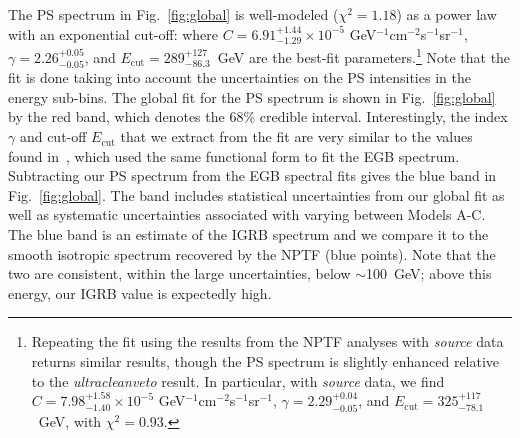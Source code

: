 The PS spectrum in Fig.~\ref{fig:global} is well-modeled (\mbox{$\chi^2 = 1.18$}) as a power law with an exponential cut-off:
where $C=6.91_{-1.29}^{+1.44} \times 10^{-5}$ GeV$^{-1}$cm$^{-2}$s$^{-1}$sr$^{-1}$,  $\gamma= 2.26_{-0.05}^{+0.05}$, and $E_\text{cut} = 289_{-86.3}^{+127}$~GeV are the best-fit parameters.\footnote{Repeating the fit using the results from the NPTF analyses with {\it source} data returns similar results, though the PS spectrum is slightly enhanced relative to the {\it ultracleanveto} result.  In particular, with {\it source} data, we find $C=7.98_{-1.40}^{+1.58} \times 10^{-5}$ GeV$^{-1}$cm$^{-2}$s$^{-1}$sr$^{-1}$,  $\gamma= 2.29_{-0.05}^{+0.04}$, and $E_\text{cut} = 325_{-78.1}^{+117}$~GeV, with $\chi^2 = 0.93$. }  Note that the fit is done taking into account the uncertainties on the PS intensities in the energy sub-bins.  The global fit for the PS spectrum is shown in Fig.~\ref{fig:global} by the red band, which denotes the 68\% credible interval.  Interestingly, the index $\gamma$ and cut-off $E_\text{cut}$ that we extract from the fit are very similar to the values found in~\cite{Ackermann:2014usa}, which used the same functional form to fit the EGB spectrum.  Subtracting our PS spectrum from the EGB spectral fits gives the blue band in Fig.~\ref{fig:global}.  The band includes statistical uncertainties from our global fit as well as systematic uncertainties associated with varying between Models A-C.  The blue band is an estimate of the IGRB spectrum and we compare it to the smooth isotropic spectrum recovered by the NPTF (blue points).  Note that the two are consistent, within the large uncertainties, below $\sim$100~GeV; above this energy, our IGRB value is expectedly high. 

